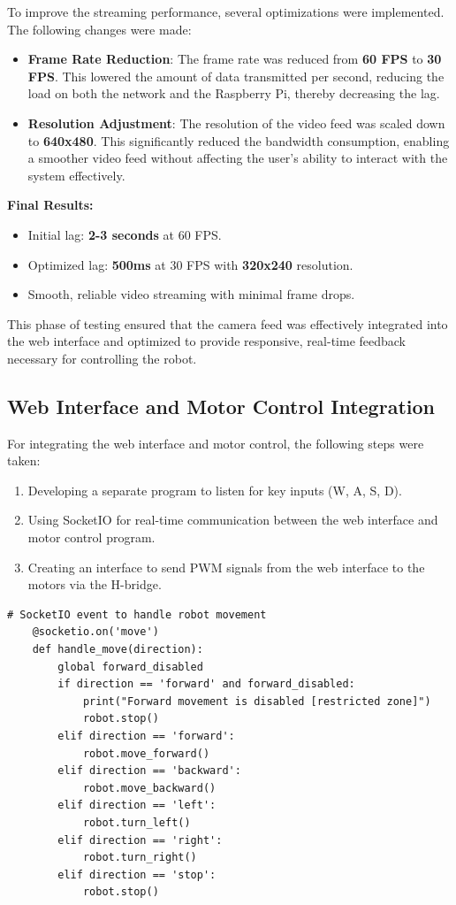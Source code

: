 To improve the streaming performance, several optimizations were implemented. The following changes were made:

\begin{itemize}
	\item \textbf{Frame Rate Reduction}: The frame rate was reduced from \textbf{60 FPS} to \textbf{30 FPS}. This lowered the amount of data transmitted per second, reducing the load on both the network and the Raspberry Pi, thereby decreasing the lag.
	\item \textbf{Resolution Adjustment}: The resolution of the video feed was scaled down to \textbf{640x480}. This significantly reduced the bandwidth consumption, enabling a smoother video feed without affecting the user's ability to interact with the system effectively.
\end{itemize}

\textbf{Final Results:}
\begin{itemize}
	\item Initial lag: \textbf{2-3 seconds} at 60 FPS.
	\item Optimized lag: \textbf{500ms} at 30 FPS with \textbf{320x240} resolution.
	\item Smooth, reliable video streaming with minimal frame drops.
\end{itemize}

This phase of testing ensured that the camera feed was effectively integrated into the web interface and optimized to provide responsive, real-time feedback necessary for controlling the robot.


\subsection{Web Interface and Motor Control Integration}

For integrating the web interface and motor control, the following steps were taken:

\begin{enumerate}
	\item Developing a separate program to listen for key inputs (W, A, S, D).
	\item Using SocketIO for real-time communication between the web interface and motor control program.
	\item Creating an interface to send PWM signals from the web interface to the motors via the H-bridge.
\end{enumerate}


\begin{lstlisting}[style=pythonstyle, caption=SocketIO event handler for robot movement]
	# SocketIO event to handle robot movement
	@socketio.on('move')
	def handle_move(direction):
		global forward_disabled
		if direction == 'forward' and forward_disabled:
			print("Forward movement is disabled [restricted zone]")
			robot.stop()
		elif direction == 'forward':
			robot.move_forward()
		elif direction == 'backward':
			robot.move_backward()
		elif direction == 'left':
			robot.turn_left()
		elif direction == 'right':
			robot.turn_right()
		elif direction == 'stop':
			robot.stop()
\end{lstlisting}



